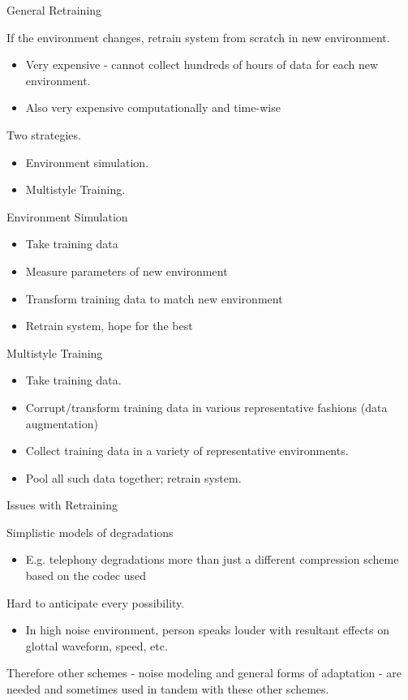 \begin{frame}{General Retraining}

If the environment changes, retrain system from scratch in new environment.
  \begin{itemize}
  \item Very expensive - cannot collect hundreds of hours of data for each new environment.
  \item Also very expensive computationally and time-wise 
  \end{itemize}
Two strategies.
  \begin{itemize}
  \item Environment simulation.
  \item Multistyle Training.
  \end{itemize}


\end{frame}

\begin{frame}{Environment Simulation}

\begin{itemize}
\item Take training data 
\item Measure parameters of new environment 
\item Transform training data to match new environment 
\item Retrain system, hope for the best
\end{itemize}
\end{frame}


\begin{frame}{Multistyle Training}

\begin{itemize}
\item Take training data.
\item Corrupt/transform training data in various representative fashions (data augmentation)
\item Collect training data in a variety of representative environments.
\item Pool all such data together; retrain system.
\end{itemize}

\end{frame}


\begin{frame}{Issues with  Retraining}


Simplistic models of degradations
  \begin{itemize}
  \item E.g. telephony degradations more than just a different compression scheme based on the codec used
  \end{itemize}
Hard to anticipate every possibility.
  \begin{itemize}
  \item In high noise environment, person speaks louder with resultant
  effects on glottal waveform, speed, etc.
  \end{itemize}
Therefore other schemes - noise modeling and general forms of
  adaptation - are needed and sometimes used in tandem with these
  other schemes.


\end{frame}

